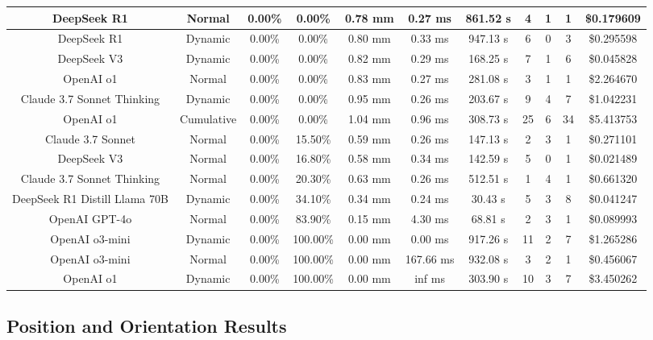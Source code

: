 \begin{table}[H]
\begin{center}
\begin{tabular}{|c|c|c|c|c|c|c|c|c|c|c|}
    \hline
    DeepSeek R1 & Normal & 0.00\% & 0.00\% & 0.78 mm & 0.27 ms & 861.52 s & 4 & 1 & 1 & \$0.179609 \\
    \hline
    DeepSeek R1 & Dynamic & 0.00\% & 0.00\% & 0.80 mm & 0.33 ms & 947.13 s & 6 & 0 & 3 & \$0.295598 \\
    \hline
    DeepSeek V3 & Dynamic & 0.00\% & 0.00\% & 0.82 mm & 0.29 ms & 168.25 s & 7 & 1 & 6 & \$0.045828 \\
    \hline
    OpenAI o1 & Normal & 0.00\% & 0.00\% & 0.83 mm & 0.27 ms & 281.08 s & 3 & 1 & 1 & \$2.264670 \\
    \hline
    Claude 3.7 Sonnet Thinking & Dynamic & 0.00\% & 0.00\% & 0.95 mm & 0.26 ms & 203.67 s & 9 & 4 & 7 & \$1.042231 \\
    \hline
    OpenAI o1 & Cumulative & 0.00\% & 0.00\% & 1.04 mm & 0.96 ms & 308.73 s & 25 & 6 & 34 & \$5.413753 \\
    \hline
    Claude 3.7 Sonnet & Normal & 0.00\% & 15.50\% & 0.59 mm & 0.26 ms & 147.13 s & 2 & 3 & 1 & \$0.271101 \\
    \hline
    DeepSeek V3 & Normal & 0.00\% & 16.80\% & 0.58 mm & 0.34 ms & 142.59 s & 5 & 0 & 1 & \$0.021489 \\
    \hline
    Claude 3.7 Sonnet Thinking & Normal & 0.00\% & 20.30\% & 0.63 mm & 0.26 ms & 512.51 s & 1 & 4 & 1 & \$0.661320 \\
    \hline
    DeepSeek R1 Distill Llama 70B & Dynamic & 0.00\% & 34.10\% & 0.34 mm & 0.24 ms & 30.43 s & 5 & 3 & 8 & \$0.041247 \\
    \hline
    OpenAI GPT-4o & Normal & 0.00\% & 83.90\% & 0.15 mm & 4.30 ms & 68.81 s & 2 & 3 & 1 & \$0.089993 \\
    \hline
    OpenAI o3-mini & Dynamic & 0.00\% & 100.00\% & 0.00 mm & 0.00 ms & 917.26 s & 11 & 2 & 7 & \$1.265286 \\
    \hline
    OpenAI o3-mini & Normal & 0.00\% & 100.00\% & 0.00 mm & 167.66 ms & 932.08 s & 3 & 2 & 1 & \$0.456067 \\
    \hline
    OpenAI o1 & Dynamic & 0.00\% & 100.00\% & 0.00 mm & inf ms & 303.90 s & 10 & 3 & 7 & \$3.450262 \\
    \hline
\end{tabular}
\label{Results-Position-1-6}
\end{center}
\end{table}

\subsection{Position and Orientation Results}

